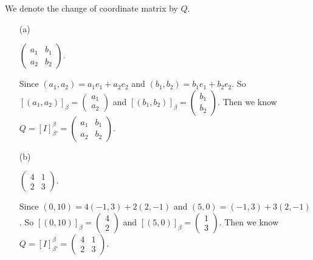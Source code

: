 \begin{Exercise}
	We denote the change of coordinate matrix by $Q$.
	\begin{enumerate}[(a)]
		\item[(a)]
		\begin{answer}
			$\begin{pmatrix}
			a_1 & b_1 \\
			a_2 & b_2
			\end{pmatrix}$.
		\end{answer}
		\begin{solution}
			Since $(a_1, a_2) = a_1 e_1 + a_2 e_2$ and $(b_1, b_2) = b_1 e_1 + b_2 e_2$. So $[(a_1,a_2)]_{\beta} = \begin{pmatrix} a_1 \\
			a_2
			\end{pmatrix}$ and $[(b_1,b_2)]_{\beta} = \begin{pmatrix} b_1 \\
			b_2
			\end{pmatrix}$. Then we know $Q = [I]_{\beta'}^{\beta} = \begin{pmatrix}
			a_1 & b_1 \\
			a_2 & b_2
			\end{pmatrix}$.
		\end{solution}
		
		\item[(b)]
		\begin{answer}
			$\begin{pmatrix}
			4 & 1 \\
			2 & 3
			\end{pmatrix}$.
		\end{answer}
		\begin{solution}
			Since $(0,10) = 4(-1,3)+2(2,-1)$ and $(5,0) = (-1,3)+3(2,-1)$. So $[(0,10)]_{\beta} = \begin{pmatrix}
			4 \\
			2
			\end{pmatrix}$ and $[(5,0)]_{\beta} = \begin{pmatrix} 
			1 \\
			3
			\end{pmatrix}$. Then we know $Q = [I]_{\beta'}^{\beta} = \begin{pmatrix}
			4 & 1 \\
			2 & 3
			\end{pmatrix}$.
		\end{solution}
		

\end{enumerate}
\end{Exercise}
